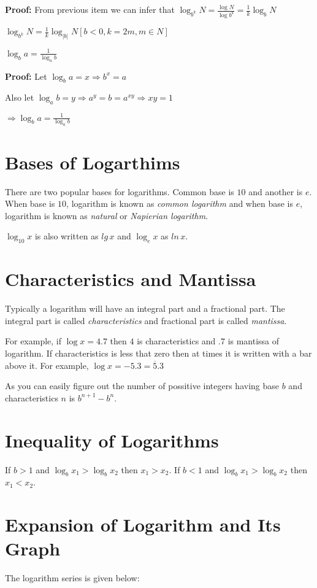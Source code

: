   {\bf Proof:} From previous item we can infer that $\log_{b^k}N = \frac{\log N}{\log b^k} = \frac{1}{k}\log_bN$

  $\log_{b^k}N = \frac{1}{k}\log_{|b|}N[b< 0, k = 2m, m\in N]$
\item $\log_ba = \frac{1}{\log_ab}$

  {\bf Proof:} Let $\log_ba = x \Rightarrow b^x = a$

  Also let $\log_ab = y \Rightarrow a^y = b = a^{xy} \Rightarrow xy = 1$

  $\Rightarrow \log_ba = \frac{1}{\log_ab}$
\stopitemize

\section{Bases of Logarthims}
There are two popular bases for logarithms. Common base is $10$ and another is $e$. When base is $10$, logarithm is known as
{\it common logarithm} and when base is $e$, logarithm is known as {\it natural} or {\it Napierian logarithm}.

$\log_{10}x$ is also written as $lg\,x$ and $\log_ex$ as $ln\,x$.

\section{Characteristics and Mantissa}
Typically a logarithm will have an integral part and a fractional part. The integral part is called {\it characteristics} and
fractional part is called {\it mantissa}.

For example, if $\log x = 4.7$ then $4$ is characteristics and $.7$ is mantissa of logarithm. If characteristics is less that zero
then at times it is written with a bar above it. For example, $\log x=-5.3=\overline{5}.3$

As you can easily figure out the number of possitive integers having base $b$ and characteristics $n$ is $b^{n + 1} - b^n$.

\section{Inequality of Logarithms}
If $b > 1$ and $\log_bx_1 > \log_bx_2$ then $x_1 > x_2$. If $b < 1$ and $\log_bx_1 > \log_bx_2$ then $x_1 < x_2$.

\section{Expansion of Logarithm and Its Graph}
The logarithm series is given below:

